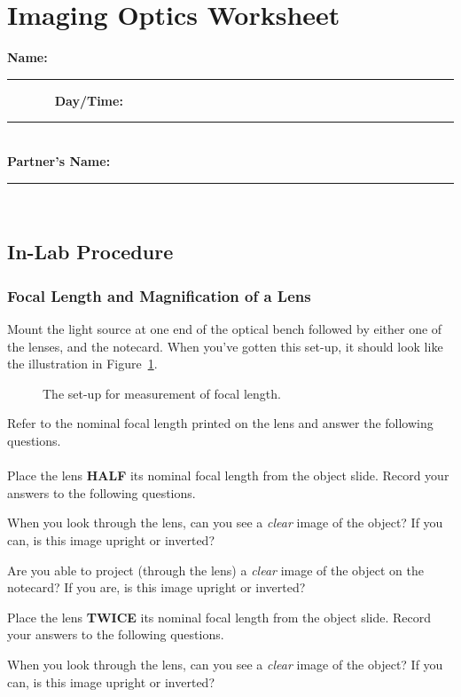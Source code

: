 \renewcommand{\thesection}{\thechapter.W}


\section{Imaging Optics Worksheet}
{\bf \Large Name:}~ \rule{5cm}{.1mm}~~~~~~~
{\bf \Large Day/Time:}~\rule{3cm}{.1mm}\\
{\bf \Large Partner's Name:}~\rule{6cm}{.1mm}\\
\subsection{In-Lab Procedure}
\subsubsection{Focal Length and Magnification of a Lens}

Mount the light source 
at one end of the optical bench followed by
either one 
of the lenses, and the notecard.   When you've gotten 
this set-up, it should look like the illustration in 
Figure~\ref{fig:opt:focalsetup}.
\begin{figure}[htb]
\centerline{\epsfxsize=14cm }
\caption{The set-up for measurement of focal length.}
\label{fig:opt:focalsetup}
\end{figure}
Refer to the nominal focal length printed on the lens and answer the following questions.  \\
\ \\ 
Place the lens {\bf HALF} its nominal focal length from the object slide. 
Record your answers to the following questions.
\vspace*{.5cm}

\noindent
When you look through the lens, can you see a {\it clear} image of the object?
If you can, is this image upright or inverted?
\vspace*{1.5cm}

\noindent
Are you able to project (through the lens) a {\it clear} image of the object
on the notecard? If you are, is this image upright or inverted?
\vspace*{1.5cm}

\noindent
Place the lens {\bf TWICE} its nominal focal length from the object slide. 
Record your answers to the following questions.
\vspace*{.5cm}

\noindent
When you look through the lens, can you see a {\it clear} image of the object?
If you can, is this image upright or inverted?
\vspace*{1.5cm}

